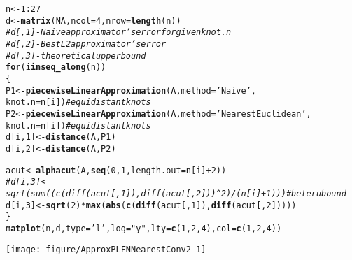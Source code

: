 \documentclass[11pt]{article}\usepackage[]{graphicx}\usepackage[]{color}
\makeatletter
\newcommand{\hlnum}[1]{\textcolor[rgb]{0.686,0.059,0.569}{#1}}%
\newcommand{\hlstr}[1]{\textcolor[rgb]{0.192,0.494,0.8}{#1}}%
\newcommand{\hlcom}[1]{\textcolor[rgb]{0.678,0.584,0.686}{\textit{#1}}}%
\newcommand{\hlopt}[1]{\textcolor[rgb]{0,0,0}{#1}}%
\newcommand{\hlstd}[1]{\textcolor[rgb]{0.345,0.345,0.345}{#1}}%
\newcommand{\hlkwa}[1]{\textcolor[rgb]{0.161,0.373,0.58}{\textbf{#1}}}%
\newcommand{\hlkwb}[1]{\textcolor[rgb]{0.69,0.353,0.396}{#1}}%
\newcommand{\hlkwc}[1]{\textcolor[rgb]{0.333,0.667,0.333}{#1}}%
\newcommand{\hlkwd}[1]{\textcolor[rgb]{0.737,0.353,0.396}{\textbf{#1}}}%
\newenvironment{kframe}{%
 \def\at@end@of@kframe{}%
 \ifinner\ifhmode%
  \def\at@end@of@kframe{\end{minipage}}%
  \begin{minipage}{\columnwidth}%
 \fi\fi%
 \def\FrameCommand##1{\hskip\@totalleftmargin \hskip-\fboxsep
 \colorbox{shadecolor}{##1}\hskip-\fboxsep
     \hskip-\linewidth \hskip-\@totalleftmargin \hskip\columnwidth}%
 \MakeFramed {\advance\hsize-\width
   \@totalleftmargin\z@ \linewidth\hsize
   \@setminipage}}%
 {\par\unskip\endMakeFramed%
 \at@end@of@kframe}
\newenvironment{knitrout}{}{} %
\makeatother
\begin{document}
\begin{knitrout}\small
{}\color{fgcolor}\begin{kframe}
\begin{alltt}
\hlstd{n} \hlkwb{<-} \hlnum{1}\hlopt{:}\hlnum{27}
\hlstd{d} \hlkwb{<-} \hlkwd{matrix}\hlstd{(}\hlnum{NA}\hlstd{,} \hlkwc{ncol}\hlstd{=}\hlnum{4}\hlstd{,} \hlkwc{nrow}\hlstd{=}\hlkwd{length}\hlstd{(n))}
\hlcom{# d[,1] - Naive approximator's error for given knot.n}
\hlcom{# d[,2] - Best L2 approximator's error}
\hlcom{# d[,3] - theoretical upper bound}
\hlkwa{for} \hlstd{(i} \hlkwa{in} \hlkwd{seq_along}\hlstd{(n))}
\hlstd{\{}
   \hlstd{P1} \hlkwb{<-} \hlkwd{piecewiseLinearApproximation}\hlstd{(A,} \hlkwc{method}\hlstd{=}\hlstr{'Naive'}\hlstd{,}
            \hlkwc{knot.n}\hlstd{=n[i])} \hlcom{# equidistant knots}
   \hlstd{P2} \hlkwb{<-} \hlkwd{piecewiseLinearApproximation}\hlstd{(A,} \hlkwc{method}\hlstd{=}\hlstr{'NearestEuclidean'}\hlstd{,}
            \hlkwc{knot.n}\hlstd{=n[i])} \hlcom{# equidistant knots}
   \hlstd{d[i,}\hlnum{1}\hlstd{]} \hlkwb{<-} \hlkwd{distance}\hlstd{(A, P1)}
   \hlstd{d[i,}\hlnum{2}\hlstd{]} \hlkwb{<-} \hlkwd{distance}\hlstd{(A, P2)}

   \hlstd{acut} \hlkwb{<-} \hlkwd{alphacut}\hlstd{(A,} \hlkwd{seq}\hlstd{(}\hlnum{0}\hlstd{,} \hlnum{1}\hlstd{,} \hlkwc{length.out}\hlstd{=n[i]}\hlopt{+}\hlnum{2}\hlstd{))}
   \hlcom{# d[i,3] <- sqrt(sum((c(diff(acut[,1]), diff(acut[,2]))^2)/(n[i]+1))) # beter ubound}
   \hlstd{d[i,}\hlnum{3}\hlstd{]} \hlkwb{<-} \hlkwd{sqrt}\hlstd{(}\hlnum{2}\hlstd{)}\hlopt{*}\hlkwd{max}\hlstd{(}\hlkwd{abs}\hlstd{(}\hlkwd{c}\hlstd{(}\hlkwd{diff}\hlstd{(acut[,}\hlnum{1}\hlstd{]),} \hlkwd{diff}\hlstd{(acut[,}\hlnum{2}\hlstd{]))))}
\hlstd{\}}
\hlkwd{matplot}\hlstd{(n, d,} \hlkwc{type}\hlstd{=}\hlstr{'l'}\hlstd{,} \hlkwc{log}\hlstd{=}\hlstr{"y"}\hlstd{,} \hlkwc{lty}\hlstd{=}\hlkwd{c}\hlstd{(}\hlnum{1}\hlstd{,}\hlnum{2}\hlstd{,}\hlnum{4}\hlstd{),} \hlkwc{col}\hlstd{=}\hlkwd{c}\hlstd{(}\hlnum{1}\hlstd{,}\hlnum{2}\hlstd{,}\hlnum{4}\hlstd{))}
\end{alltt}
\end{kframe}
\end{knitrout}

\begin{center}
\begin{knitrout}\small
{}\color{fgcolor}

{\centering \texttt{[image: figure/ApproxPLFNNearestConv2-1]} 

}



\end{knitrout}
\end{center}
\end{document}
